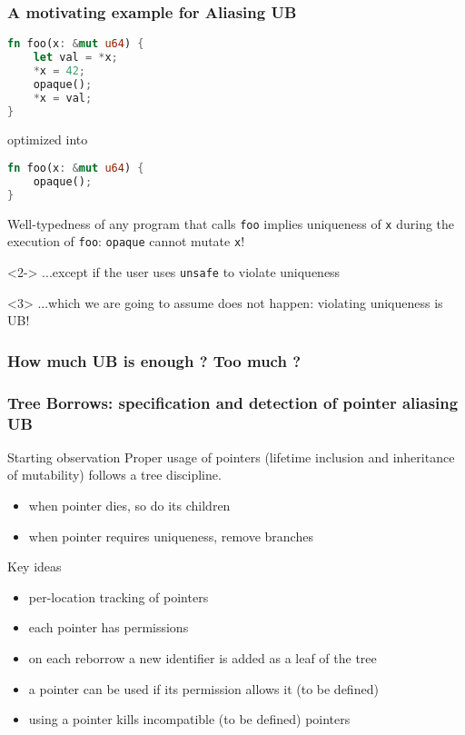 \begin{frame}[fragile, t]
    \frametitle{A motivating example for Aliasing UB}
    \begin{lstlisting}[language=rust]
fn foo(x: &mut u64) {
    let val = *x;
    *x = 42;
    opaque();
    *x = val;
}
    \end{lstlisting}
    optimized into
    \begin{lstlisting}[language=rust]
fn foo(x: &mut u64) {
    opaque();
}
    \end{lstlisting}
    Well-typedness of any program that calls \texttt{foo} implies uniqueness
    of \texttt{x} during the execution of \texttt{foo}: \texttt{opaque} cannot mutate \texttt{x}!\\
    \begin{onlyenv}<2->
    ...except if the user uses \texttt{unsafe} to violate uniqueness \\
    \end{onlyenv}
    \begin{onlyenv}<3>
    ...which we are going to assume does not happen: violating uniqueness is UB!
    \end{onlyenv}
\end{frame}

\begin{frame}[fragile, t]
    \frametitle{How much UB is enough ? Too much ?}
    \vspace{-1em}
    \begin{figure}
    \end{figure}
\end{frame}

\begin{frame}[t]
    \frametitle{Tree Borrows: specification and detection of pointer aliasing UB}
    \begin{alertblock}{Starting observation}
        Proper usage of pointers (lifetime inclusion and inheritance of mutability) follows a tree discipline.
        \begin{itemize}
            \item when pointer dies, so do its children
            \item when pointer requires uniqueness, remove branches
        \end{itemize}
    \end{alertblock}
    \begin{block}{Key ideas}
        \begin{itemize}
            \item per-location tracking of pointers
            \item each pointer has permissions
            \item on each reborrow a new identifier is added as a leaf of the tree
            \item a pointer can be used if its permission allows it (to be defined)
            \item using a pointer kills incompatible (to be defined) pointers
        \end{itemize}
    \end{block}
\end{frame}

